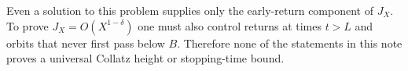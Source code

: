 \documentclass[11pt]{amsart}
\theoremstyle{remark}
\newcommand{\1}{\mathbf1}
\begin{document}
Even a solution to this problem supplies only the early-return component of $J_X$. To prove $J_X=O(X^{1-\delta})$ one must also control returns at times $t>L$ and orbits that never first pass below $B$. Therefore none of the statements in this note proves a universal Collatz height or stopping-time bound.
\end{document}
